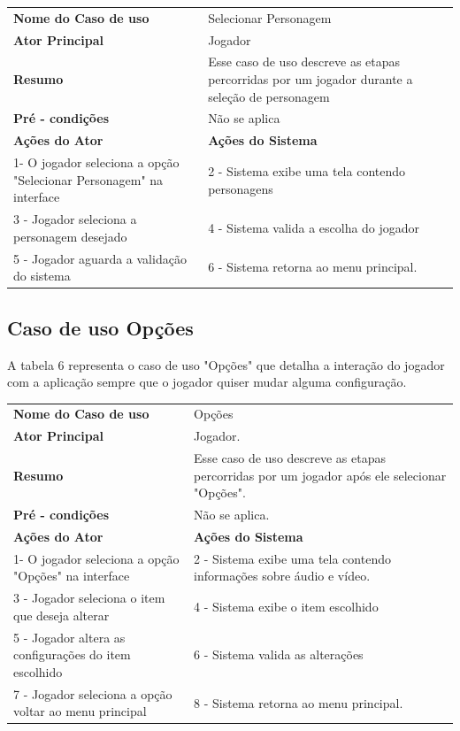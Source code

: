 \begin{table}[h!]
\centering 
{} 
\begin{tabular}{ | m{5cm} | m{8cm}| }  
\hline
\textbf {Nome do Caso de uso} & Selecionar Personagem \\ 
\textbf {Ator Principal} & Jogador \\  
\textbf {Resumo} & Esse caso de uso descreve as etapas percorridas por um jogador durante a seleção de personagem \\ 
\textbf {Pré - condições} & Não se aplica\\ 
\hline 
\textbf {Ações do Ator} & \textbf {Ações do Sistema}\\ 
\hline 
1- O jogador seleciona a opção "Selecionar Personagem" na interface & 2 - Sistema exibe uma tela contendo personagens\\
3 - Jogador seleciona a personagem desejado & 4 - Sistema valida a escolha do jogador\\
5 - Jogador aguarda a validação do sistema & 6 - Sistema retorna ao menu principal.\\
\hline 
\end{tabular} 
\end{table} 

\subsection{Caso de uso Opções} 
A tabela 6 representa o caso de uso "Opções" que detalha a interação do jogador com a aplicação sempre que o jogador quiser mudar alguma configuração. 

\begin{table}  [h!]
\centering 
{} 
\begin{tabular}{ | m{5cm} | m{8cm}| }  
\hline 
\textbf {Nome do Caso de uso} & Opções \\  
\textbf {Ator Principal} & Jogador. \\  
\textbf {Resumo} & Esse caso de uso descreve as etapas percorridas por um jogador após ele selecionar "Opções".\\ 
\textbf {Pré - condições} & Não se aplica.\\ 
\hline 
\textbf {Ações do Ator} & \textbf {Ações do Sistema}\\ 
\hline 
1- O jogador seleciona a opção "Opções" na interface & 2 - Sistema exibe uma tela contendo informações sobre áudio e vídeo.\\ 
3 - Jogador seleciona o item que deseja alterar & 4 - Sistema exibe o item escolhido\\
5 - Jogador altera as configurações do item escolhido & 6 - Sistema valida as alterações\\
7 - Jogador seleciona a opção voltar ao menu principal & 8 - Sistema retorna ao menu principal.\\
\hline 
\end{tabular} 
\end{table} 
 \pagebreak
 
